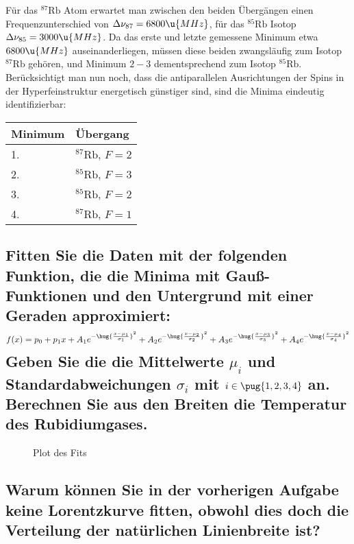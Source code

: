 \documentclass[ex,minted]{exercise_4.1}
\begin{document}
Für das ${}^{87}\mathrm{Rb}$ Atom erwartet man zwischen den beiden Übergängen einen Frequenzunterschied von \(\Delta \nu_{87}=6800\u{MHz}\), für das  ${}^{85}\mathrm{Rb}$ Isotop \(\Delta \nu_{85}=3000\u{MHz}\). Da das erste und letzte gemessene Minimum etwa \(6800\u{MHz}\) auseinanderliegen, müssen diese beiden zwangsläufig zum Isotop \({}^{87}\mathrm{Rb}\) gehören, und Minimum \(2-3\) dementsprechend zum Isotop \({}^{85}\mathrm{Rb}\). Berücksichtigt man nun noch, dass die antiparallelen Ausrichtungen der Spins in der Hyperfeinstruktur energetisch günstiger sind, sind die Minima eindeutig identifizierbar: 
\begin{center}
\begin{tabular}{@{}ll@{}}
    \toprule 
    {\bf Minimum} & {\bf Übergang}\\\midrule
    1. & ${}^{87}\mathrm{Rb}$, \(F=2\) \\
    2. & ${}^{85}\mathrm{Rb}$, \(F=3\)\\
    3. & ${}^{85}\mathrm{Rb}$, \(F=2\)\\
    4. & ${}^{87}\mathrm{Rb}$, \(F=1\)\\\bottomrule
\end{tabular}
\end{center}


\subsection{Fitten Sie die Daten mit der folgenden Funktion, die die Minima mit Gauß-Funktionen und den Untergrund mit einer Geraden approximiert:
\begin{align*}
    f (x) = p_0 + p_1 x + A_1e^{-\hug{\frac{x-\mu_1}{\sigma_1}}^2}
    + A_2e^{-\hug{\frac{x-\mu_2}{\sigma_2}}^2}
    + A_3e^{-\hug{\frac{x-\mu_3}{\sigma_3}}^2}
    + A_4e^{-\hug{\frac{x-\mu_4}{\sigma_4}}^2}
\end{align*}
Geben Sie die die Mittelwerte \(\mu_i\) und Standardabweichungen \(\sigma_i\) mit $i \in \pug{1, 2, 3, 4}$ an. Berechnen Sie aus
den Breiten die Temperatur des Rubidiumgases.}

\dottedlinett


\begin{figure}[H]
    \centering
    
    \caption{Plot des Fits}
\end{figure}


\subsection{Warum können Sie in der vorherigen Aufgabe keine Lorentzkurve fitten, obwohl dies doch die Verteilung der natürlichen Linienbreite ist?}
\end{document}
